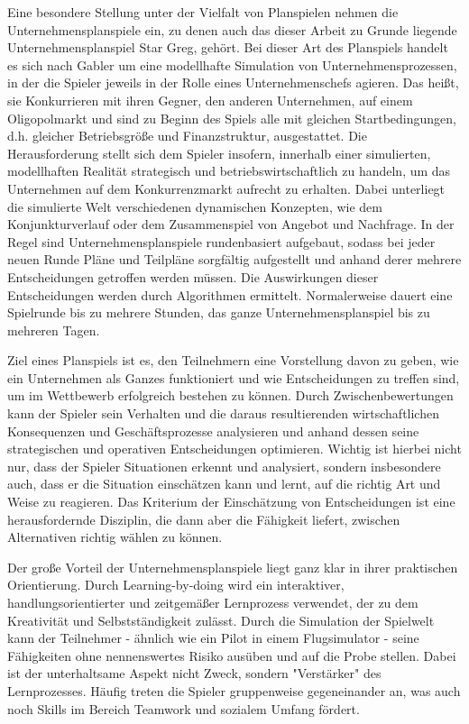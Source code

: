 Eine besondere Stellung unter der Vielfalt von Planspielen nehmen die Unternehmensplanspiele ein, zu denen auch das dieser Arbeit zu Grunde liegende Unternehmensplanspiel Star Greg, gehört. Bei dieser Art des Planspiels handelt es sich nach Gabler um eine modellhafte Simulation von Unternehmensprozessen, in der die Spieler jeweils in der Rolle eines Unternehmenschefs agieren. Das heißt, sie Konkurrieren mit ihren Gegner, den anderen Unternehmen, auf einem Oligopolmarkt und sind zu Beginn des Spiels alle mit gleichen Startbedingungen, d.h. gleicher Betriebsgröße und Finanzstruktur, ausgestattet. Die Herausforderung stellt sich dem Spieler insofern, innerhalb einer simulierten, modellhaften Realität strategisch und betriebswirtschaftlich zu handeln, um das Unternehmen auf dem Konkurrenzmarkt aufrecht zu erhalten. Dabei  unterliegt die simulierte Welt verschiedenen dynamischen Konzepten, wie dem Konjunkturverlauf oder dem Zusammenspiel von Angebot und Nachfrage. In der Regel sind Unternehmensplanspiele rundenbasiert aufgebaut, sodass bei jeder neuen Runde Pläne und Teilpläne sorgfältig aufgestellt und anhand derer mehrere Entscheidungen getroffen werden müssen. Die Auswirkungen dieser Entscheidungen werden durch Algorithmen ermittelt. Normalerweise dauert eine Spielrunde bis zu mehrere Stunden, das ganze Unternehmensplanspiel bis zu mehreren Tagen.

Ziel eines Planspiels ist es, den Teilnehmern eine Vorstellung davon zu geben, wie ein Unternehmen als Ganzes funktioniert und wie Entscheidungen zu treffen sind, um im Wettbewerb erfolgreich bestehen zu können. Durch Zwischenbewertungen kann der Spieler sein Verhalten und die daraus resultierenden wirtschaftlichen Konsequenzen und Geschäftsprozesse analysieren und anhand dessen seine strategischen und operativen Entscheidungen optimieren. Wichtig ist hierbei nicht nur, dass der Spieler Situationen erkennt und analysiert, sondern insbesondere auch, dass er die Situation einschätzen kann und lernt, auf die richtig Art und Weise zu reagieren. Das Kriterium der Einschätzung von Entscheidungen ist eine herausfordernde Disziplin, die dann aber die Fähigkeit liefert, zwischen Alternativen richtig wählen zu können. 

Der große Vorteil der Unternehmensplanspiele liegt ganz klar in ihrer praktischen Orientierung. Durch Learning-by-doing wird ein interaktiver, handlungsorientierter und zeitgemäßer Lernprozess verwendet, der zu dem Kreativität und Selbstständigkeit zulässt. Durch die Simulation der Spielwelt kann der Teilnehmer - ähnlich wie ein Pilot in einem Flugsimulator - seine Fähigkeiten ohne nennenswertes Risiko ausüben und auf die Probe stellen. Dabei ist der unterhaltsame Aspekt nicht Zweck, sondern "Verstärker" des Lernprozesses. Häufig treten die Spieler gruppenweise gegeneinander an, was auch noch Skills im Bereich Teamwork und sozialem Umfang fördert. 
